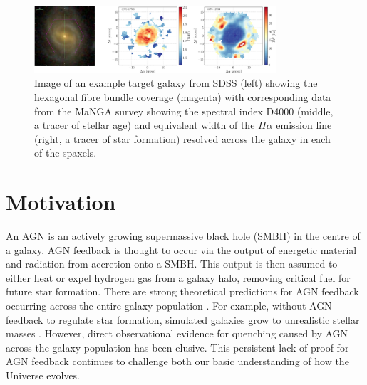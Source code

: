 \documentclass[11pt]{article}
\begin{document}
\vspace{-0.5em}

\begin{figure}[h]
\begin{centering}
\includegraphics[width=0.8\textwidth]{image_halpha_vel_map_8078-12703_gal_aligned_ifu_bundles-MAPS-VOR10-GAU-MILESHC.pdf}
\vspace{-0.5em}
\caption[8pt]{Image of an example target galaxy from SDSS (left) showing the hexagonal fibre bundle coverage (magenta) with corresponding data from the MaNGA survey showing the spectral index D4000 (middle, a tracer of stellar age) and equivalent width of the $H\alpha$ emission line (right, a tracer of star formation) resolved across the galaxy in each of the spaxels.}
\label{gal}
\end{centering}
\vspace{-1.5em}
\end{figure}
\vspace{-0.5em}

\section*{\large Motivation}
\vspace{-0.5em}

\indent An AGN is an actively growing supermassive black hole (SMBH) in the centre of a galaxy. %
AGN feedback is thought to occur via the output of energetic material and radiation from accretion onto a SMBH. This output is then assumed to either heat or expel hydrogen gas from a galaxy halo, removing critical fuel for future star formation. There are strong theoretical predictions for AGN feedback occurring across the entire galaxy population \citep{Fabian12, Gaibler12}. For example, without AGN feedback to regulate star formation, simulated galaxies grow to unrealistic stellar masses \citep[e.g.][]{silk12}. However, direct observational evidence for quenching caused by AGN across the galaxy population has been elusive. This persistent lack of proof for AGN feedback continues to challenge both our basic understanding of how the Universe evolves. 
\end{document}
